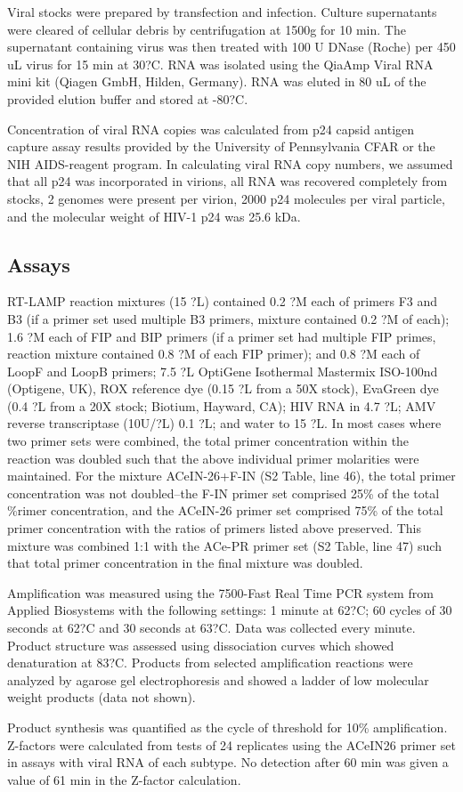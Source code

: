 \documentclass[../sherrill-Mix_thesis.tex]{subfiles}
\begin{document}
	Viral stocks were prepared by transfection and infection. Culture supernatants were cleared of cellular debris by centrifugation at 1500g for 10 min. The supernatant containing virus was then treated with 100 U DNase (Roche) per 450 uL virus for 15 min at 30?C. RNA was isolated using the QiaAmp Viral RNA mini kit (Qiagen GmbH, Hilden, Germany). RNA was eluted in 80 uL of the provided elution buffer and stored at -80?C.

	Concentration of viral RNA copies was calculated from p24 capsid antigen capture assay results provided by the University of Pennsylvania CFAR or the NIH AIDS-reagent program. In calculating viral RNA copy numbers, we assumed that all p24 was incorporated in virions, all RNA was recovered completely from stocks, 2 genomes were present per virion, 2000 p24 molecules per viral particle, and the molecular weight of HIV-1 p24 was 25.6 kDa.

	\subsection{Assays}

	RT-LAMP reaction mixtures (15 ?L) contained 0.2 ?M each of primers F3 and B3 (if a primer set used multiple B3 primers, mixture contained 0.2 ?M of each); 1.6 ?M each of FIP and BIP primers (if a primer set had multiple FIP primes, reaction mixture contained 0.8 ?M of each FIP primer); and 0.8 ?M each of LoopF and LoopB primers; 7.5 ?L OptiGene Isothermal Mastermix ISO-100nd (Optigene, UK), ROX reference dye (0.15 ?L from a 50X stock), EvaGreen dye (0.4 ?L from a 20X stock; Biotium, Hayward, CA); HIV RNA in 4.7 ?L; AMV reverse transcriptase (10U/?L) 0.1 ?L; and water to 15 ?L. In most cases where two primer sets were combined, the total primer concentration within the reaction was doubled such that the above individual primer molarities were maintained. For the mixture ACeIN-26+F-IN (S2 Table, line 46), the total primer concentration was not doubled--the F-IN primer set comprised 25\% of the total \%rimer concentration, and the ACeIN-26 primer set comprised 75\% of the total primer concentration with the ratios of primers listed above preserved. This mixture was combined 1:1 with the ACe-PR primer set (S2 Table, line 47) such that total primer concentration in the final mixture was doubled.

	Amplification was measured using the 7500-Fast Real Time PCR system from Applied Biosystems with the following settings: 1 minute at 62?C; 60 cycles of 30 seconds at 62?C and 30 seconds at 63?C. Data was collected every minute. Product structure was assessed using dissociation curves which showed denaturation at 83?C. Products from selected amplification reactions were analyzed by agarose gel electrophoresis and showed a ladder of low molecular weight products (data not shown).

	Product synthesis was quantified as the cycle of threshold for 10\% amplification. Z-factors \citep{Zhang1999} were calculated from tests of 24 replicates using the ACeIN26 primer set in assays with viral RNA of each subtype. No detection after 60 min was given a value of 61 min in the Z-factor calculation.
\end{document}
